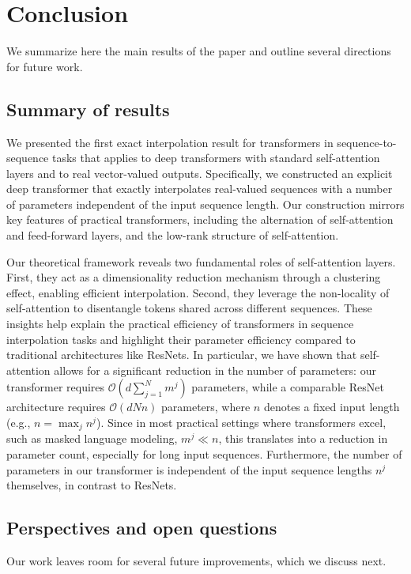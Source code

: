 \documentclass[pdflatex,sn-mathphys-num]{sn-jnl}%
\theoremstyle{thmstyleone}%
\theoremstyle{thmstyletwo}%
\theoremstyle{thmstylethree}%
\numberwithin{equation}{section}
\begin{document}
\section{Conclusion}\label{sec:conclusion}

We summarize here the main results of the paper and outline several directions for future work.

\subsection{Summary of results}

We presented the first exact interpolation result for transformers in sequence-to-sequence tasks that applies to deep transformers with standard self-attention layers and to real vector-valued outputs. Specifically, we constructed an explicit deep transformer that exactly interpolates real-valued sequences with a number of parameters independent of the input sequence length. Our construction mirrors key features of practical transformers, including the alternation of self-attention and feed-forward layers, and the low-rank structure of self-attention.

Our theoretical framework reveals two fundamental roles of self-attention layers. First, they act as a dimensionality reduction mechanism through a clustering effect, enabling efficient interpolation. Second, they leverage the non-locality of self-attention to disentangle tokens shared across different sequences. These insights help explain the practical efficiency of transformers in sequence interpolation tasks and highlight their parameter efficiency compared to traditional architectures like ResNets. 
In particular, we have shown that self-attention allows for a significant reduction in the number of parameters: our transformer requires $\mathcal{O}(d \sum_{j=1}^N m^j)$ parameters, while a comparable ResNet architecture requires $\mathcal{O}\left(d N n \right)$ parameters, where $n$ denotes a fixed input length (e.g., $n = \max_j n^j$). Since in most practical settings where transformers excel, such as masked language modeling, \( m^j \ll n \), this translates into a reduction in parameter count, especially for long input sequences. Furthermore, the number of parameters in our transformer is independent of the input sequence lengths $n^j$ themselves, in contrast to ResNets.

\subsection{Perspectives and open questions}
Our work leaves room for several future improvements, which we discuss next.
\end{document}
